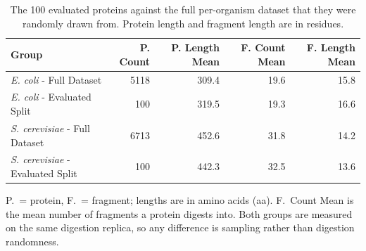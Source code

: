 \begin{table}[!tb]
  \centering
  \caption{The 100 evaluated proteins against the full per-organism dataset that they were randomly drawn from. Protein length and fragment length are in residues.}
  \label{tab:dataset_coverage}
  \begin{tabular}{lrrrr}
    \toprule
    Group & P. Count & P. Length Mean & F. Count Mean & F. Length Mean \\
    \midrule
    \textit{E. coli} - Full Dataset & 5118 & 309.4 & 19.6 & 15.8 \\
    \textit{E. coli} - Evaluated Split & 100 & 319.5 & 19.3 & 16.6 \\
    \midrule
    \textit{S. cerevisiae} - Full Dataset & 6713 & 452.6 & 31.8 & 14.2 \\
    \textit{S. cerevisiae} - Evaluated Split & 100 & 442.3 & 32.5 & 13.6 \\
    \bottomrule
  \end{tabular}
  \par\smallskip\footnotesize{P.\ = protein, F.\ = fragment; lengths are in amino acids (aa). F.\ Count Mean is the mean number of fragments a protein digests into. Both groups are measured on the same digestion replica, so any difference is sampling rather than digestion randomness.}
\end{table}

